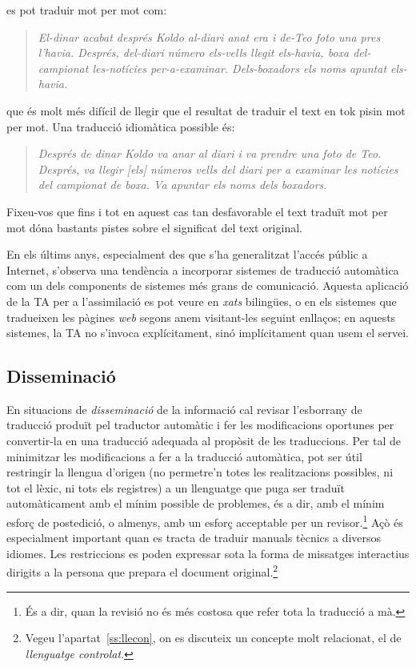 es pot traduir mot per mot com:
\begin{quote}{\sl El-dinar acabat després Koldo al-diari anat era i
    de-Teo foto una pres l'havia. Després, del-diari número els-vells
    llegit els-havia, boxa del-campionat les-notícies
    per-a-examinar. Dels-boxadors els noms apuntat els-havia.}
\end{quote}
que és molt més difícil de llegir que el resultat de traduir el text
en tok pisin mot per mot. Una traducció idiomàtica possible és:
\begin{quote}{\sl Després de dinar Koldo va anar al diari i va prendre
    una foto de Teo. Després, va llegir [els] números vells del diari
    per a examinar les notícies del campionat de boxa. Va apuntar els
    noms dels boxadors.}
\end{quote}   
Fixeu-vos que fins i tot en aquest cas tan desfavorable el text
traduït mot per mot dóna bastants pistes sobre el significat del text
original.

En els últims anys, especialment des que s'ha generalitzat l'accés
públic a Internet, s'observa una tendència a incorporar sistemes de
traducció automàtica com un dels components de sistemes més grans de
comunicació.  Aquesta aplicació de la TA per a l'assimilació es pot
veure en \emph{xats} bilingües, o en els sistemes que tradueixen les
pàgines \emph{web} segons anem visitant-les seguint enllaços; en
aquests sistemes, la TA no s'invoca explícitament, sinó implícitament
quan usem el servei.

\subsection{Disseminació} 
En situacions de \emph{disseminació} de la informació cal revisar
l'esborrany de traducció produït pel traductor automàtic i fer les
modificacions oportunes per convertir-la en una traducció adequada al
propòsit de les traduccions.  Per tal de minimitzar les modificacions
a fer a la traducció automàtica, pot ser útil restringir la llengua
d'origen (no permetre'n totes les realitzacions possibles, ni tot el
lèxic, ni tots els registres) a un llenguatge que puga ser traduït
automàticament amb el mínim possible de problemes, és a dir, amb el
mínim esforç de postedició, o almenys, amb un esforç acceptable per un
revisor.\footnote{És a dir, quan la revisió no és més costosa que
  refer tota la traducció a mà.} Açò és especialment important quan es
tracta de traduir manuals tècnics a diversos idiomes. Les restriccions
es poden expressar sota la forma de missatges interactius dirigits a
la persona que prepara el document original.\footnote{Vegeu
  l'apartat~\ref{ss:llecon}, on es discuteix un concepte molt
  relacionat, el de \emph{llenguatge controlat}.}

